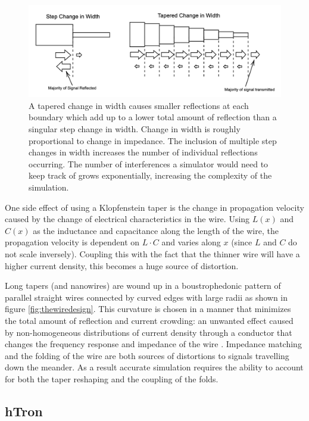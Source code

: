 \begin{figure}[h]
  \centering
  \includegraphics[width=5in]{figs/whatsataper.png}
  
  \caption{A tapered change in width causes smaller reflections at each boundary which add up to a lower total amount of reflection than a singular step change in width. Change in width is roughly proportional to change in impedance. The inclusion of multiple step changes in
  width increases the number of individual reflections occurring. 
  The number of interferences a simulator would need to keep track of grows 
  exponentially, increasing the complexity of the simulation.}
 \label{fig:whatsataper}
\end{figure}

One side effect of using a Klopfenstein taper is the change in propagation velocity 
caused by the change of electrical characteristics in the wire. Using $L(x)$ and $C(x)$ 
as the inductance and capacitance along the length of the wire, 
the propagation velocity is dependent on $L\cdot C$ and varies along $x$ (since 
$L$ and $C$ do not scale inversely). Coupling this with the fact that the thinner wire will 
have a higher current density, this becomes a huge source of distortion.

Long tapers (and nanowires) are wound up in a 
boustrophedonic pattern of parallel straight wires 
connected by curved edges with 
large radii as shown in figure \ref{fig:thewiredesign}. This curvature is chosen in a manner that minimizes the total amount of reflection
and current crowding: an unwanted effect caused by non-homogeneous distributions 
of current density through a conductor that changes the frequency response and impedance 
of the wire \cite{Akhlaghi:12}. Impedance matching and the folding of 
the wire are both sources of distortions
to signals travelling down the meander. As a result accurate simulation requires the ability to account for both the taper reshaping and the coupling of the folds.

\subsection{hTron}


